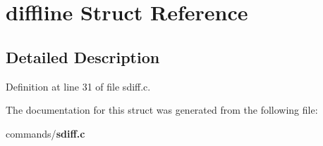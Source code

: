 \section{diffline Struct Reference}
\label{structdiffline}


\subsection{Detailed Description}


Definition at line 31 of file sdiff.c.



The documentation for this struct was generated from the following file:\begin{DoxyCompactItemize}
\item 
commands/{\bf sdiff.c}\end{DoxyCompactItemize}

